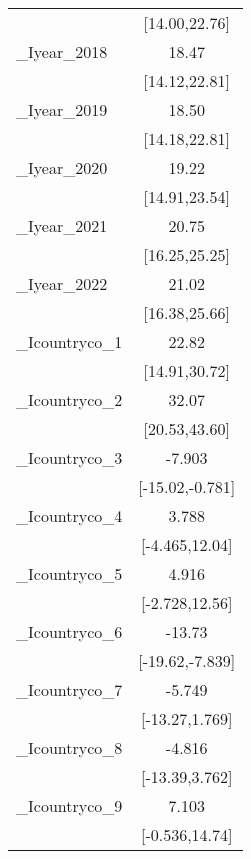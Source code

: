 {\begin{tabular}{l*{1}{c}}
            &         [14.00,22.76]         \\
[1em]
\_Iyear\_2018 &                 18.47\sym{***}\\
            &         [14.12,22.81]         \\
[1em]
\_Iyear\_2019 &                 18.50\sym{***}\\
            &         [14.18,22.81]         \\
[1em]
\_Iyear\_2020 &                 19.22\sym{***}\\
            &         [14.91,23.54]         \\
[1em]
\_Iyear\_2021 &                 20.75\sym{***}\\
            &         [16.25,25.25]         \\
[1em]
\_Iyear\_2022 &                 21.02\sym{***}\\
            &         [16.38,25.66]         \\
[1em]
\_Icountryco\_1&                 22.82\sym{***}\\
            &         [14.91,30.72]         \\
[1em]
\_Icountryco\_2&                 32.07\sym{***}\\
            &         [20.53,43.60]         \\
[1em]
\_Icountryco\_3&                -7.903\sym{*}  \\
            &       [-15.02,-0.781]         \\
[1em]
\_Icountryco\_4&                 3.788         \\
            &        [-4.465,12.04]         \\
[1em]
\_Icountryco\_5&                 4.916         \\
            &        [-2.728,12.56]         \\
[1em]
\_Icountryco\_6&                -13.73\sym{***}\\
            &       [-19.62,-7.839]         \\
[1em]
\_Icountryco\_7&                -5.749         \\
            &        [-13.27,1.769]         \\
[1em]
\_Icountryco\_8&                -4.816         \\
            &        [-13.39,3.762]         \\
[1em]
\_Icountryco\_9&                 7.103         \\
            &        [-0.536,14.74]         \\

\end{tabular}}
